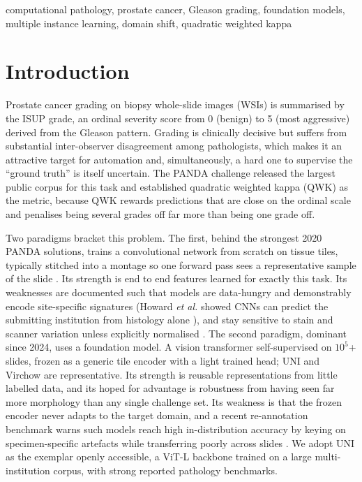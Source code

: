 \documentclass[conference]{IEEEtran}
\begin{document}
\begin{IEEEkeywords}
computational pathology, prostate cancer, Gleason grading, foundation models,
multiple instance learning, domain shift, quadratic weighted kappa
\end{IEEEkeywords}

\section{Introduction}

Prostate cancer grading on biopsy whole-slide images (WSIs) is summarised by the
ISUP grade, an ordinal severity score from 0 (benign) to 5 (most aggressive)
derived from the Gleason pattern. Grading is clinically decisive but suffers from
substantial inter-observer disagreement among pathologists, which makes it an
attractive target for automation and, simultaneously, a hard one to supervise
the ``ground truth'' is itself uncertain. The PANDA challenge \cite{bulten}
released the largest public corpus for this task and established quadratic
weighted kappa (QWK) as the metric, because QWK rewards predictions that are close
on the ordinal scale and penalises being several grades off far more than being
one grade off.

Two paradigms bracket this problem. The first, behind the strongest 2020 PANDA
solutions, trains a convolutional network from scratch on tissue tiles, typically
stitched into a montage so one forward pass sees a representative sample of the
slide \cite{tan,baselines}. Its strength is end to end features learned for exactly
this task. Its weaknesses are documented such that models are data-hungry and
demonstrably encode site-specific signatures (Howard \textit{et al.} showed CNNs
can predict the submitting institution from histology alone \cite{howard}), and
stay sensitive to stain and scanner variation unless explicitly normalised
\cite{tellez}. The second paradigm, dominant since 2024, uses a foundation
model. A vision transformer self-supervised on $10^5$+ slides, frozen as a generic
tile encoder with a light trained head; UNI \cite{chen} and Virchow \cite{virchow}
are representative. Its strength is reusable representations from little labelled
data, and its hoped for advantage is robustness from having seen far more
morphology than any single challenge set. Its weakness is that the frozen encoder
never adapts to the target domain, and a recent re-annotation benchmark warns such
models reach high in-distribution accuracy by keying on specimen-specific artefacts
while transferring poorly across slides \cite{pandaplus}. We adopt UNI as the
exemplar openly accessible, a ViT-L backbone trained on a large multi-institution
corpus, with strong reported pathology benchmarks.
\end{document}
